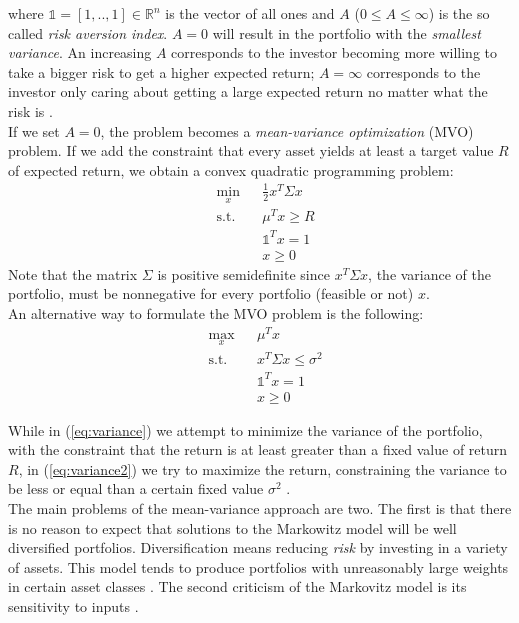 where $\mathds{1} = [1, .., 1] \in \mathbb{R}^n$ is the vector of all ones and $A$ ($0 \leq A \leq \infty$) is the so called \textit{risk aversion index}. $A = 0$ will result in the portfolio with the \textit{smallest variance}. An increasing $A$ corresponds to the investor becoming more willing to take a bigger risk to get a higher expected return; $A = \infty$ corresponds to the investor only caring about getting a large expected return no matter what the risk is \cite{markovitz}.\\
If we set $A=0$, the problem becomes a \textit{mean-variance
optimization} (MVO) problem. If we add the constraint that every asset yields at least a target value $R$ of expected return, we obtain a convex quadratic programming problem:
\begin{equation}\label{eq:variance}
\begin{aligned}
&\min_x &&\frac{1}{2}x^T \Sigma x\\
&\text{s.t.}
&&\mu^T x \geq R\\
&&&\mathds{1}^T x=1\\
&&&x \geq 0
\end{aligned}
\end{equation}
Note that the matrix $\Sigma$ is positive semidefinite since $x^T \Sigma x$, the variance of the portfolio, must be nonnegative for every portfolio (feasible or not) $x$.\\
An alternative way to formulate the MVO problem is the following:
\begin{equation}\label{eq:variance2}
\begin{aligned}
&\max_x &&\mu^Tx\\
&\text{s.t.}
&&x^T \Sigma x \leq \sigma^2\\
&&&\mathds{1}^T x=1\\
&&&x \geq 0
\end{aligned}
\end{equation}

While in (\ref{eq:variance}) we attempt to minimize the variance of the portfolio, with the constraint that the return is at least greater than a fixed value of return $R$, in (\ref{eq:variance2}) we try to maximize the return, constraining the variance to be less or equal than a certain fixed value $\sigma^2$ \cite{libro}.\\
The main problems of the mean-variance approach are two. The first is that there is no reason to expect that solutions to the Markowitz model will be well diversified portfolios. Diversification means reducing \textit{risk} by investing in a variety of assets. This model tends to produce portfolios with unreasonably large weights in certain asset classes \cite{libro}. The second criticism of the Markovitz model is its sensitivity to inputs \cite{tutuncu}.